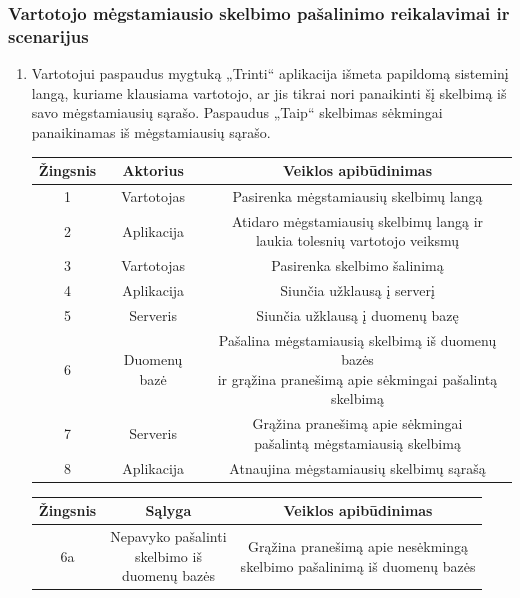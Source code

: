 \documentclass[12pt]{article}
\begin{document}
	\subsubsection{Vartotojo mėgstamiausio skelbimo pašalinimo reikalavimai ir scenarijus}
	\begin{enumerate}
		\item Vartotojui paspaudus mygtuką „Trinti“ aplikacija išmeta papildomą sisteminį langą, kuriame klausiama vartotojo, ar jis tikrai nori panaikinti šį skelbimą iš savo mėgstamiausių sąrašo. Paspaudus „Taip“ skelbimas sėkmingai panaikinamas iš mėgstamiausių sąrašo. 
		
		\begin{center}
		\begin{tabular}{ | c | c | c | }
			\hline
			Žingsnis & Aktorius       & Veiklos apibūdinimas \\ \hline
			1        & Vartotojas     & Pasirenka mėgstamiausių skelbimų langą \\ \hline
			2        & Aplikacija     & \makecell{Atidaro mėgstamiausių skelbimų langą ir \\ laukia tolesnių vartotojo veiksmų} \\ \hline
			3        & Vartotojas     & Pasirenka skelbimo šalinimą \\ \hline
			4        & Aplikacija     & Siunčia užklausą į serverį \\ \hline
			5        & Serveris       & Siunčia užklausą į duomenų bazę  \\ \hline
			6        & Duomenų bazė   & \makecell{Pašalina mėgstamiausią skelbimą iš duomenų bazės \\ ir grąžina pranešimą apie sėkmingai pašalintą skelbimą} \\ \hline
			7        & Serveris       & \makecell{Grąžina pranešimą apie sėkmingai \\ pašalintą mėgstamiausią skelbimą} \\ \hline
			8        & Aplikacija     & Atnaujina mėgstamiausių skelbimų sąrašą \\ \hline
		\end{tabular}
		\end{center}	
		
		\begin{center}
		\begin{tabular}{ | c | c | c | }
			\hline
			Žingsnis & Sąlyga                                     & Veiklos apibūdinimas \\ \hline
			6a       & \makecell{Nepavyko pašalinti \\ skelbimo iš \\ duomenų bazės} & \makecell{Grąžina pranešimą apie nesėkmingą \\ skelbimo pašalinimą iš duomenų bazės} \\ \hline
		\end{tabular}
		\end{center}
	\end{enumerate}	
	\pagebreak	
	
\end{document}
